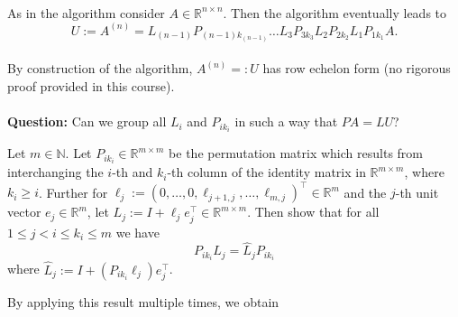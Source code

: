 \color{fontcolor}
\begin{frame}
	~\\
	As in the algorithm consider $A\in\mathbb{R}^{n \times n}$. Then the algorithm eventually leads to
	$$U:=A^{(n)}=L_{(n-1)}P_{(n-1)k_{(n-1)}}\dots L_3P_{3k_3}L_2P_{2k_2}L_1P_{1k_1}A.$$
	~\\
	By construction of the algorithm, $A^{(n)}=:U$ has row echelon form (no rigorous proof provided in this course).
	~\\
~\\
		\textbf{Question:}	Can we group all $L_i$ and $P_{ik_i}$ in such a way that $PA=LU$?\\
		\begin{lemma} \small
			Let $m\in\mathbb{N}$.  Let $P_{ik_i} \in \mathbb{R}^{m \times m}$ be the permutation matrix which results from interchanging the $i$-th and $k_i$-th column of the identity matrix in $\mathbb{R}^{m \times m}$, where $k_i \geq i$. Further for $\ell_j := (0,\ldots,0,\ell_{j+1,j},\ldots,\ell_{m,j})^\top\in\mathbb{R}^m$ and the $j$-th unit vector $e_j\in\mathbb{R}^m$, let $L_j := I + \ell_je_j^\top \in \mathbb{R}^{m\times m}$.
			Then show that for all $1 \leq j< i \leq k_i\leq m$ we have
			$$P_{ik_i} L_j = \widehat{L}_j P_{ik_i}$$
			where $\widehat{L}_j :=  I + (P_{ik_i}\ell_j)e_j^\top$.
		\end{lemma}
\end{frame}

\begin{frame}
	By applying this result multiple times, we obtain
\end{frame}


